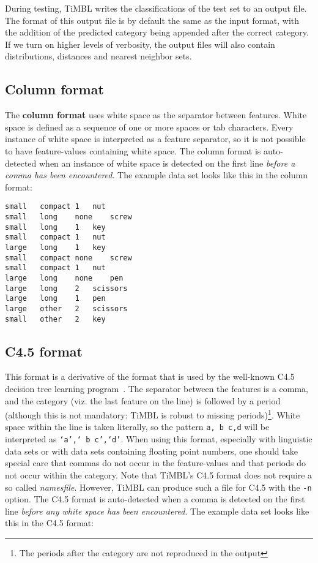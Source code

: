 \documentclass{report}
\begin{document}
During testing, TiMBL writes the classifications of the test set to an
output file. The format of this output file is by default the same as
the input format, with the addition of the predicted category being
appended after the correct category. If we turn on higher levels of
verbosity, the output files will also contain distributions, distances
and nearest neighbor sets.

\subsection{Column format}
\label{comlumnformat}

The {\bf column format} uses white space as the separator between
features. White space is defined as a sequence of one or more spaces or
tab characters. Every instance of white space is interpreted as a
feature separator, so it is not possible to have feature-values
containing white space. The column format is auto-detected when an
instance of white space is detected on the first line {\em before a
comma has been encountered}. The example data set looks like this in
the column format:

\begin{footnotesize}
\begin{verbatim}
small	compact	1	nut
small	long	none	screw
small	long	1	key
small	compact	1	nut
large	long	1	key
small	compact	none	screw
small	compact	1	nut
large	long	none	pen
large	long	2	scissors
large	long	1	pen
large	other	2	scissors
small	other	2	key
\end{verbatim}
\end{footnotesize}

\subsection{C4.5 format}
\label{c45format}

This format is a derivative of the format that is used by the
well-known C4.5 decision tree learning program~\cite{Quinlan93}.  The
separator between the features is a comma, and the category (viz.  the
last feature on the line) is followed by a period (although this is
not mandatory: TiMBL is robust to missing periods)\footnote{The
periods after the category are not reproduced in the output}.  White
space within the line is taken literally, so the pattern {\tt a, b
c,d} will be interpreted as {\tt `a',` b c',`d'}.  When using this
format, especially with linguistic data sets or with data sets
containing floating point numbers, one should take special care that
commas do not occur in the feature-values and that periods do not
occur within the category.  Note that TiMBL's C4.5 format does not
require a so called {\em namesfile}.  However, TiMBL can produce such
a file for C4.5 with the {\tt -n} option.  The C4.5 format is
auto-detected when a comma is detected on the first line {\em before
any white space has been encountered}. The example data set looks like
this in the C4.5 format:
\end{document}
